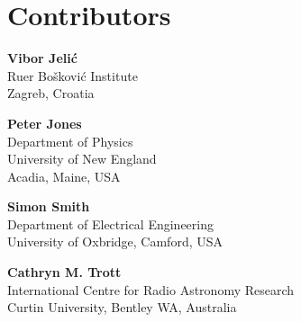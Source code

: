 
\chapter*{Contributors}
 


{\parskip=12pt

\noindent\textbf{Vibor Jeli\'c}\\
Ru{\dj}er Bo\v{s}kovi\'{c} Institute\\
Zagreb, Croatia 

\noindent\textbf{Peter Jones}\\
Department of Physics\\
University of New England\\
Acadia, Maine, USA

\noindent\textbf{Simon Smith}\\
Department of Electrical Engineering\\
University of Oxbridge, 
Camford, USA

\noindent\textbf{Cathryn M. Trott}\\
International Centre for Radio Astronomy Research\\
Curtin University, Bentley WA, Australia

}
